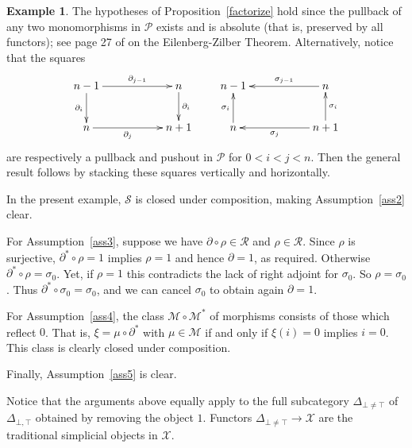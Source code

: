 \documentclass[a4paper,12pt,reqno]{amsart}
\theoremstyle{definition}
\newtheorem{example}[theorem]{Example}
\theoremstyle{fact}
\theoremstyle{genquest}
\theoremstyle{step}
\newcommand{\ra}{\rightarrow}
\def\CM{{\mathscr M}}
\def\CP{{\mathscr P}}
\def\CR{{\mathscr R}}
\def\CS{{\mathscr S}}
\def\CX{{\mathscr X}}
\begin{document}
\begin{example}
The hypotheses of Proposition~\ref{factorize} hold since the pullback of any two 
monomorphisms in $\CP$ exists and is absolute (that is, preserved by all functors); 
see page 27 of \cite{GabZis} on the Eilenberg-Zilber Theorem. 
Alternatively, notice that the squares
\begin{eqnarray*}
\xymatrix{
n-1 \ar[rr]^-{\partial_{j-1}} \ar[d]_-{\partial_{i}} && n \ar[d]^-{\partial_{i}} \\
n \ar[rr]_-{\partial_{j}}  && n+1 }
\qquad
\xymatrix{
n-1  && n \ar[ll]_-{\sigma_{j-1}} \\
n \ar[u]^-{\sigma_i}  && n+1 \ar[u]_-{\sigma_i} \ar[ll]^-{\sigma_j}}
\end{eqnarray*}
are respectively a pullback and pushout in $\CP$ for $0< i < j < n$.
Then the general result follows by stacking these squares vertically and horizontally.

In the present example, $\CS$ is closed under composition, making Assumption~\ref{ass2} clear.

For Assumption~\ref{ass3}, suppose we have $\partial \circ \rho \in \CR$ and $\rho \in \CR$. Since $\rho$ is surjective, $\partial^* \circ \rho = 1$ implies $\rho = 1$ 
and hence $\partial = 1$, as required. Otherwise $\partial^* \circ \rho = \sigma_0$.
Yet, if $\rho = 1$ this contradicts the lack of right adjoint for $\sigma_0$.
So $\rho = \sigma_0$. Thus $\partial^* \circ \sigma_0 = \sigma_0$, and we can
cancel $\sigma_0$ to obtain again $\partial = 1$. 

For Assumption~\ref{ass4}, the class $\CM\circ \CM^*$ of morphisms consists of
those which reflect $0$. That is, $\xi = \mu \circ \partial^*$ with
$\mu\in \CM$ if and only if $\xi(i)=0$ implies $i=0$. This class is
clearly closed under composition. 

Finally, Assumption~\ref{ass5} is clear. 

Notice that the arguments above equally apply to the full subcategory  
$\Delta_{\bot\neq\top}$ of $\Delta_{\bot,\top}$ obtained by removing the object $1$.
Functors $\Delta_{\bot\neq \top}\ra \CX$ are the traditional simplicial objects in $\CX$. 
\end{example}
\end{document}
